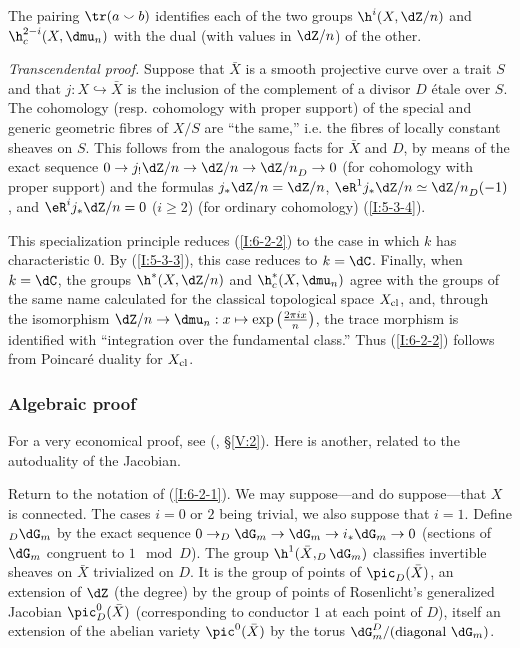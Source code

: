 \begin{theorem}\label{I:6-2-2}
The pairing $\tr(a\smallsmile b)$ identifies each of the two groups
$\h^i(X,\dZ/n)$ and $\h_c^{2-i}(X,\dmu_n)$ with the dual (with values
in $\dZ/n$) of the other.
\end{theorem}

\emph{Transcendental proof.} Suppose that $\bar X$ is a smooth projective
curve over a trait $S$ and that $j:X\hookrightarrow\bar X$ is the
inclusion of the complement of a divisor $D$ étale over $S$. The
cohomology (resp. cohomology with proper support) of the special and
generic geometric fibres of $X/S$ are “the same,” i.e. the fibres of
locally constant sheaves on $S$. This follows from the analogous facts
for $\bar X$ and $D$, by means of the exact sequence
$0\to j_!\dZ/n\to\dZ/n\to{\dZ/n}_D\to0$ (for cohomology with proper
support) and the formulas $j_*\dZ/n=\dZ/n$,
$\eR^1j_*\dZ/n\simeq{\dZ/n}_D(-1)$, and
$\eR^ij_*\dZ/n=0$ ($i\geqslant2$) (for ordinary cohomology)
(\ref{I:5-3-4}).

This specialization principle reduces (\ref{I:6-2-2}) to the case in
which $k$ has characteristic $0$. By (\ref{I:5-3-3}), this case reduces
to $k=\dC$. Finally, when $k=\dC$, the groups
$\h^*(X,\dZ/n)$ and $\h_c^*(X,\dmu_n)$ agree with the
groups of the same name calculated for the classical topological space
$X_{\textnormal{cl}}$, and, through the isomorphism
$\dZ/n\to\dmu_n:x\mapsto\exp\left(\frac{2\pi ix}{n}\right)$, the trace
morphism is identified with “integration over the fundamental class.”
Thus (\ref{I:6-2-2}) follows from Poincaré duality for
$X_{\textnormal{cl}}$.

\subsubsection{Algebraic proof}\label{I:6-2-3}

For a very economical proof, see (, \S\ref{V:2}).
Here is another, related to the autoduality of the Jacobian.

Return to the notation of (\ref{I:6-2-1}). We may suppose---and do
suppose---that $X$ is connected. The cases $i=0$ or $2$ being
trivial, we also suppose that $i=1$. Define $_D\dG_m$ by the exact
sequence $0\to_D\dG_m\to\dG_m\to i_*\dG_m\to0$ (sections of $\dG_m$
congruent to $1\mod D$). The group $\h^1(\bar X,_D\dG_m)$ classifies
invertible sheaves on $\bar X$ trivialized on $D$. It is the group of
points of $\pic_D(\bar X)$, an extension of $\dZ$ (the degree) by the
group of points of Rosenlicht's generalized Jacobian
$\pic_D^0(\bar X)$ (corresponding to conductor $1$ at each point of
$D$), itself an extension of the abelian variety $\pic^0(\bar X)$ by
the torus $\dG_m^D/(\text{diagonal $\dG_m$})$.

